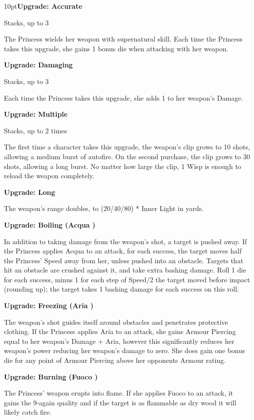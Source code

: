 \begin{myindentpar}{10pt}\textbf{Upgrade: Accurate}

Stacks, up to 3

The Princess wields her weapon with supernatural skill. Each time the Princess takes this upgrade, she gains 1 bonus die when attacking with her weapon.

\textbf{Upgrade: Damaging}

Stacks, up to 3

Each time the Princess takes this upgrade, she adds 1 to her weapon’s Damage. 

\textbf{Upgrade: Multiple}

Stacks, up to 2 times

The first time a character takes this upgrade, the weapon's clip grows to 10 shots, allowing a medium burst of autofire. On the second purchase, the clip grows to 30 shots, allowing a long burst. No matter how large the clip, 1 Wisp is enough to reload the weapon completely.

\textbf{Upgrade: Long}

The weapon's range doubles, to (20/40/80) * Inner Light in yards.

\textbf{Upgrade: Boiling (Acqua \textbullet\textbullet)}

In addition to taking damage from the weapon's shot, a target is pushed away. If the Princess applies Acqua to an attack, for each success, the target moves half the Princess' Speed away from her, unless pushed into an obstacle. Targets that hit an obstacle are crushed against it, and take extra bashing damage. Roll 1 die for each success, minus 1 for each step of Speed/2 the target moved before impact (rounding up); the target takes 1 bashing damage for each success on this roll.

\textbf{Upgrade: Freezing (Aria \textbullet\textbullet)}

The weapon's shot guides itself around obstacles and penetrates protective clothing. If the Princess applies Aria to an attack, she gains Armour Piercing equal to her weapon's Damage + Aria, however this significantly reduces her weapon's power reducing her weapon's damage to zero. She does gain one bonus die for any point of Armour Piercing above her opponents Armour rating. 

\textbf{Upgrade: Burning (Fuoco \textbullet\textbullet)}

The Princess' weapon erupts into flame. If she applies Fuoco to an attack, it gains the 9-again quality and if the target is as flammable as dry wood it will likely catch fire. 


\end{myindentpar}
